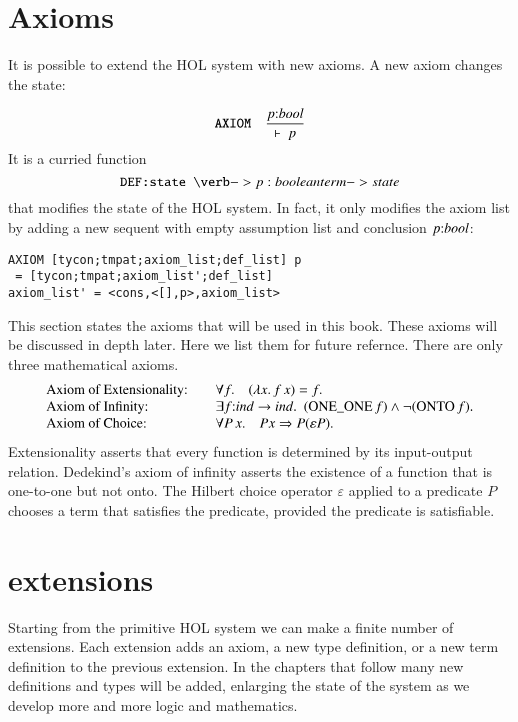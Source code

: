 \documentclass[cup9a]{cupbook}
\def\tc{\hbox{:}}
\begin{document}
\section{Axioms}

It is possible to extend the HOL system with new axioms.  A new axiom changes the state:

$$
\verb!AXIOM!\quad \frac{p\tc bool}
{\vdash~p}
$$
It is a curried function
$$
\verb!DEF:state \verb! -> {p : boolean term} -> state
$$
that modifies the state of the HOL system.  In fact, it only modifies the axiom list by adding a new sequent with empty assumption list and conclusion $p\tc bool$:
\begin{verbatim}
AXIOM [tycon;tmpat;axiom_list;def_list] p 
 = [tycon;tmpat;axiom_list';def_list]
axiom_list' = <cons,<[],p>,axiom_list>
\end{verbatim}



This section states the axioms that will be used in this book. These axioms will be discussed in depth later.  Here we list them for future refernce.  There are only three mathematical axioms.
$$\begin{array}{lll}
\hbox{Axiom of Extensionality:} &\quad\forall f.\hskip1em(\lambda x.\, f\, x) = f.\\
\hbox{Axiom of Infinity:} &\quad\exists f\tc ind\to ind.~~(\op{ONE\_ONE}\,f) \land \neg(\op{ONTO}\, f).\\
\hbox{Axiom of Choice:}&\quad  
\forall P\,x.\hskip1em P x \Rightarrow  P(\varepsilon P).\\
\end{array}
$$
Extensionality asserts that every function is determined by its input-output relation. Dedekind's axiom of infinity asserts the existence of a function that is one-to-one but not onto.  The Hilbert choice operator $\varepsilon$ applied to a predicate $P$ chooses a term that satisfies the predicate, provided the
predicate is satisfiable.


\section{extensions}

Starting from the primitive HOL system we can make a finite number of extensions.  Each extension adds an axiom, a new type definition, or a new term definition to the previous extension.  In the chapters that follow many new definitions and types will be added, enlarging the state of the system as we develop more and more logic and mathematics.
\end{document}
